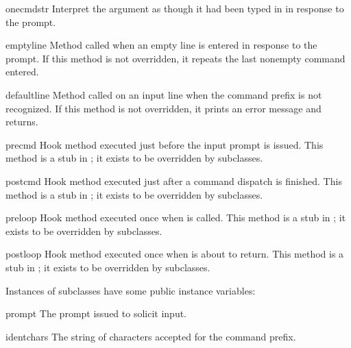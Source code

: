 \begin{methoddesc}{onecmd}{str}
Interpret the argument as though it had been typed in in
response to the prompt.
\end{methoddesc}

\begin{methoddesc}{emptyline}{}
Method called when an empty line is entered in response to the prompt.
If this method is not overridden, it repeats the last nonempty command
entered.  
\end{methoddesc}

\begin{methoddesc}{default}{line}
Method called on an input line when the command prefix is not
recognized. If this method is not overridden, it prints an
error message and returns.
\end{methoddesc}

\begin{methoddesc}{precmd}
Hook method executed just before the input prompt is issued.  This method is  
a stub in ; it exists to be overridden by subclasses.
\end{methoddesc}

\begin{methoddesc}{postcmd}
Hook method executed just after a command dispatch is finished.  This
method is a stub in ; it exists to be overridden by
subclasses.
\end{methoddesc}

\begin{methoddesc}{preloop}
Hook method executed once when  is called.  This method is  
a stub in ; it exists to be overridden by subclasses.
\end{methoddesc}

\begin{methoddesc}{postloop}
Hook method executed once when  is about to return.  This
method is a stub in ; it exists to be overridden by
subclasses.
\end{methoddesc}

Instances of  subclasses have some public instance variables:

\begin{memberdesc}{prompt}
The prompt issued to solicit input.
\end{memberdesc}

\begin{memberdesc}{identchars}
The string of characters accepted for the command prefix.
\end{memberdesc}


